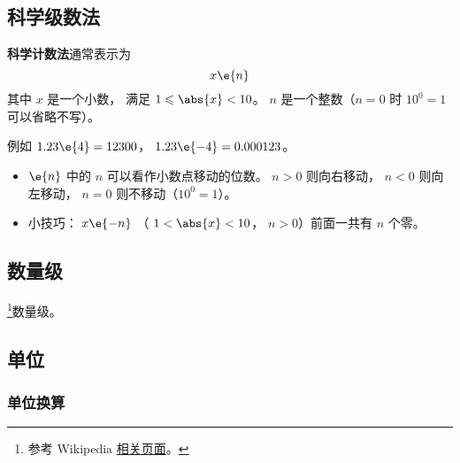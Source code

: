 
\begin{issues}
\issueDraft
\end{issues}

\subsection{科学级数法}
\textbf{科学计数法}通常表示为
\begin{equation}
x \e{n}
\end{equation}
其中 $x$ 是一个小数， 满足 $1 \leqslant \abs{x} < 10$。 $n$ 是一个整数（$n=0$ 时 $10^{0} = 1$ 可以省略不写）。

例如 $1.23\e{4} = 12300$， $1.23\e{-4} = 0.000123$。

\begin{itemize}
\item $\e{n}$ 中的 $n$ 可以看作小数点移动的位数。 $n > 0$ 则向右移动， $n < 0$ 则向左移动， $n=0$ 则不移动（$10^{0} = 1$）。
\item 小技巧： $x\e{-n}$ （ $1 < \abs{x} < 10$， $n > 0$）前面一共有 $n$ 个零。
\end{itemize}

\subsection{数量级}
\footnote{参考 Wikipedia \href{https://en.wikipedia.org/wiki/Order_of_magnitude}{相关页面}。}数量级。

\subsection{单位}

\subsubsection{单位换算}

